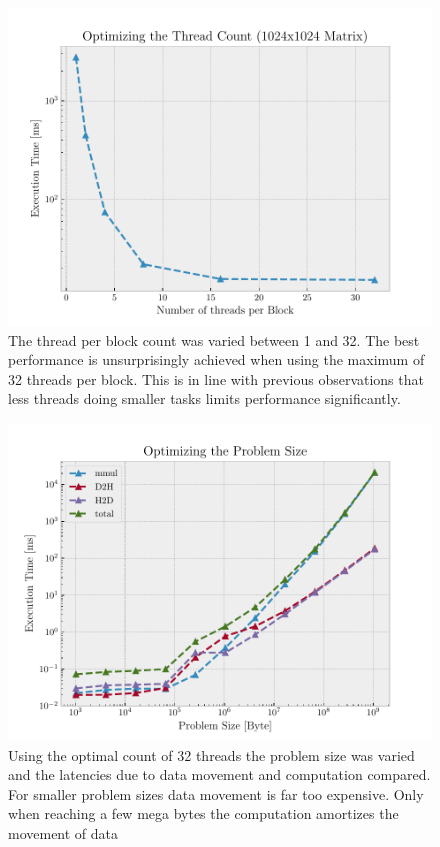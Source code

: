 \documentclass[12pt]{article}
\begin{document}
\begin{figure}[htpb]
	\centering
	\includegraphics[width=1\linewidth]{../eval/thread_count.pdf}
	\caption{The thread per block count was varied between 1 and 32.
The best performance is unsurprisingly achieved when using the maximum of 32
threads per block. This is in line with previous observations that less threads
doing smaller tasks limits performance significantly.}
	\label{fig:../eval/thread_count}
\end{figure}

\begin{figure}[htpb]
	\centering
	\includegraphics[width=1\linewidth]{../eval/problem_size.pdf}
	\caption{Using the optimal count of 32 threads the problem size was varied
and the latencies due to data movement and computation compared.
For smaller problem sizes data movement is far too expensive.
Only when reaching a few mega bytes the computation amortizes the movement of data}%
	\label{fig:../eval/problem_size}
\end{figure}
\end{document}

